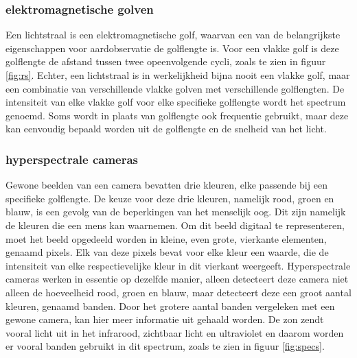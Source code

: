 \documentclass[12pt]{report}
\begin{document}

\subsubsection{elektromagnetische golven}
Een lichtstraal is een elektromagnetische golf, waarvan een van de belangrijkste eigenschappen voor aardobservatie de golflengte is. Voor een vlakke golf is deze golflengte de afstand tussen twee opeenvolgende cycli, zoals te zien in figuur \ref{fig:rs}. Echter, een lichtstraal is in werkelijkheid bijna nooit een vlakke golf, maar een combinatie van verschillende vlakke golven met verschillende golflengten. De intensiteit van elke vlakke golf voor elke specifieke golflengte wordt het spectrum genoemd. Soms wordt in plaats van golflengte ook frequentie gebruikt, maar deze kan eenvoudig bepaald worden uit de golflengte en de snelheid van het licht.

\subsubsection{hyperspectrale cameras}
Gewone beelden van een camera bevatten drie kleuren, elke passende bij een specifieke golflengte. De keuze voor deze drie kleuren, namelijk rood, groen en blauw, is een gevolg van de beperkingen van het menselijk oog. Dit zijn namelijk de kleuren die een mens kan waarnemen. Om dit beeld digitaal te representeren, moet het beeld opgedeeld worden in kleine, even grote, vierkante elementen, genaamd pixels. Elk van deze pixels bevat voor elke kleur een waarde, die de intensiteit van elke respectievelijke kleur in dit vierkant weergeeft. Hyperspectrale cameras werken in essentie op dezelfde manier, alleen detecteert deze camera niet alleen de hoeveelheid rood, groen en blauw, maar detecteert deze een groot aantal kleuren, genaamd banden. Door het grotere aantal banden vergeleken met een gewone camera, kan hier meer informatie uit gehaald worden. De zon zendt vooral licht uit in het infrarood, zichtbaar licht en ultraviolet en daarom worden er vooral banden gebruikt in dit spectrum, zoals te zien in figuur \ref{fig:specs}.
\end{document}
